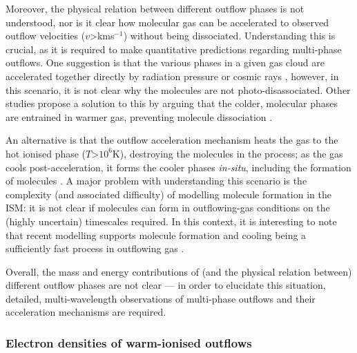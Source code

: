 Moreover, the physical relation between different outflow phases is not understood, nor is it clear how molecular gas can be accelerated to observed outflow velocities ($v$\;\textgreater{}\;km\;s$^{-1}$) without being dissociated. Understanding this is crucial, as it is required to make quantitative predictions regarding multi-phase outflows. One suggestion is that the various phases in a given gas cloud are accelerated together directly by radiation pressure or cosmic rays \citep{Booth2013, Costa2018, Hopkins2020}, however, in this scenario, it is not clear why the molecules are not photo-disassociated. Other studies propose a solution to this by arguing that the colder, molecular phases are entrained in warmer gas, preventing molecule dissociation \citep{Scannapieco2015, Gaspari2017, Gronke2020}. 

An alternative is that the outflow acceleration mechanism heats the gas to the hot ionised phase ($T$\;\textgreater\;$10^6$\;K), destroying the molecules in the process; as the gas cools post-acceleration, it forms the cooler phases \textit{in-situ}, including the formation of molecules \citep{Wang1995, Silich2003, Tadhunter2014, Zubovas2014, Costa2015, Thompson2016, Richings2021}. A major problem with understanding this scenario is the complexity (and associated difficulty) of modelling molecule formation in the ISM: it is not clear if molecules can form in outflowing-gas conditions on the (highly uncertain) timescales required. In this context, it is interesting to note that recent modelling supports molecule formation and cooling being a sufficiently fast process in outflowing gas \citep{Richings2021}.

Overall, the mass and energy contributions of (and the physical relation between) different outflow phases are not clear --- in order to elucidate this situation, detailed, multi-wavelength observations of multi-phase outflows and their acceleration mechanisms are required.

\subsubsection{Electron densities of warm-ionised outflows}
\label{section: introduction: outflows: energetics: electron_densities}

